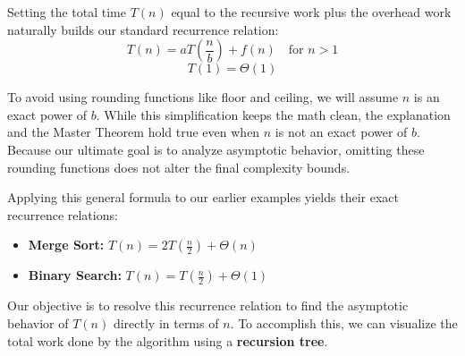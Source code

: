 \documentclass[11pt, a4paper]{article}
\begin{document}
Setting the total time $T(n)$ equal to the recursive work plus the overhead work naturally builds our standard recurrence relation:
\[ T(n) = aT\left(\frac{n}{b}\right) + f(n) \quad \text{for } n > 1 \]
\[ T(1) = \Theta(1) \]

 To avoid using rounding functions like floor and ceiling, we will assume $n$ is an exact power of $b$. While this simplification keeps the math clean, the explanation and the Master Theorem hold true even when $n$ is not an exact power of $b$. Because our ultimate goal is to analyze asymptotic behavior, omitting these rounding functions does not alter the final complexity bounds.

Applying this general formula to our earlier examples yields their exact recurrence relations:
\begin{itemize}
    \item \textbf{Merge Sort:} $T(n) = 2T\left(\frac{n}{2}\right) + \Theta(n)$
    \item \textbf{Binary Search:} $T(n) = T\left(\frac{n}{2}\right) + \Theta(1)$
\end{itemize}

Our objective is to resolve this recurrence relation to find the asymptotic behavior of $T(n)$ directly in terms of $n$. To accomplish this, we can visualize the total work done by the algorithm using a \textbf{recursion tree}.
\newpage
\end{document}
